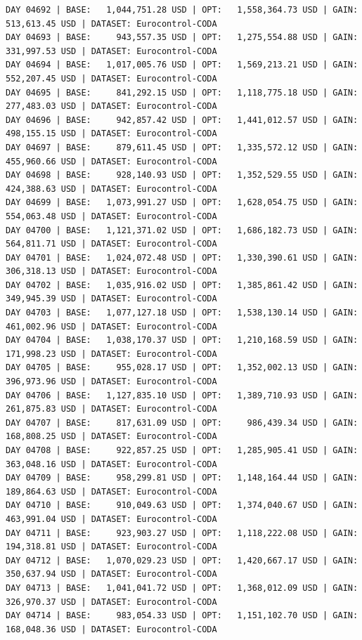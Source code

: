 \documentclass[11pt,a4paper]{article}
\begin{document}
\begin{verbatim}
DAY 04692 | BASE:   1,044,751.28 USD | OPT:   1,558,364.73 USD | GAIN: 513,613.45 USD | DATASET: Eurocontrol-CODA
DAY 04693 | BASE:     943,557.35 USD | OPT:   1,275,554.88 USD | GAIN: 331,997.53 USD | DATASET: Eurocontrol-CODA
DAY 04694 | BASE:   1,017,005.76 USD | OPT:   1,569,213.21 USD | GAIN: 552,207.45 USD | DATASET: Eurocontrol-CODA
DAY 04695 | BASE:     841,292.15 USD | OPT:   1,118,775.18 USD | GAIN: 277,483.03 USD | DATASET: Eurocontrol-CODA
DAY 04696 | BASE:     942,857.42 USD | OPT:   1,441,012.57 USD | GAIN: 498,155.15 USD | DATASET: Eurocontrol-CODA
DAY 04697 | BASE:     879,611.45 USD | OPT:   1,335,572.12 USD | GAIN: 455,960.66 USD | DATASET: Eurocontrol-CODA
DAY 04698 | BASE:     928,140.93 USD | OPT:   1,352,529.55 USD | GAIN: 424,388.63 USD | DATASET: Eurocontrol-CODA
DAY 04699 | BASE:   1,073,991.27 USD | OPT:   1,628,054.75 USD | GAIN: 554,063.48 USD | DATASET: Eurocontrol-CODA
DAY 04700 | BASE:   1,121,371.02 USD | OPT:   1,686,182.73 USD | GAIN: 564,811.71 USD | DATASET: Eurocontrol-CODA
DAY 04701 | BASE:   1,024,072.48 USD | OPT:   1,330,390.61 USD | GAIN: 306,318.13 USD | DATASET: Eurocontrol-CODA
DAY 04702 | BASE:   1,035,916.02 USD | OPT:   1,385,861.42 USD | GAIN: 349,945.39 USD | DATASET: Eurocontrol-CODA
DAY 04703 | BASE:   1,077,127.18 USD | OPT:   1,538,130.14 USD | GAIN: 461,002.96 USD | DATASET: Eurocontrol-CODA
DAY 04704 | BASE:   1,038,170.37 USD | OPT:   1,210,168.59 USD | GAIN: 171,998.23 USD | DATASET: Eurocontrol-CODA
DAY 04705 | BASE:     955,028.17 USD | OPT:   1,352,002.13 USD | GAIN: 396,973.96 USD | DATASET: Eurocontrol-CODA
DAY 04706 | BASE:   1,127,835.10 USD | OPT:   1,389,710.93 USD | GAIN: 261,875.83 USD | DATASET: Eurocontrol-CODA
DAY 04707 | BASE:     817,631.09 USD | OPT:     986,439.34 USD | GAIN: 168,808.25 USD | DATASET: Eurocontrol-CODA
DAY 04708 | BASE:     922,857.25 USD | OPT:   1,285,905.41 USD | GAIN: 363,048.16 USD | DATASET: Eurocontrol-CODA
DAY 04709 | BASE:     958,299.81 USD | OPT:   1,148,164.44 USD | GAIN: 189,864.63 USD | DATASET: Eurocontrol-CODA
DAY 04710 | BASE:     910,049.63 USD | OPT:   1,374,040.67 USD | GAIN: 463,991.04 USD | DATASET: Eurocontrol-CODA
DAY 04711 | BASE:     923,903.27 USD | OPT:   1,118,222.08 USD | GAIN: 194,318.81 USD | DATASET: Eurocontrol-CODA
DAY 04712 | BASE:   1,070,029.23 USD | OPT:   1,420,667.17 USD | GAIN: 350,637.94 USD | DATASET: Eurocontrol-CODA
DAY 04713 | BASE:   1,041,041.72 USD | OPT:   1,368,012.09 USD | GAIN: 326,970.37 USD | DATASET: Eurocontrol-CODA
DAY 04714 | BASE:     983,054.33 USD | OPT:   1,151,102.70 USD | GAIN: 168,048.36 USD | DATASET: Eurocontrol-CODA

\end{verbatim}
\end{document}
